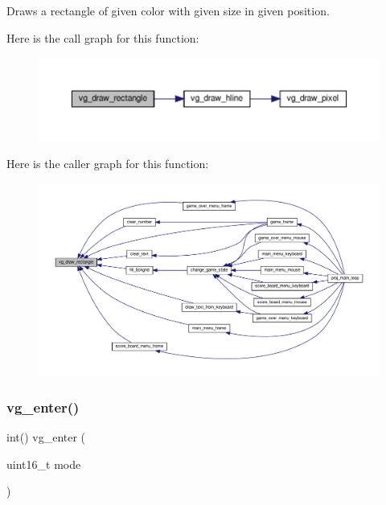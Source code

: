 Draws a rectangle of given color with given size in given position. 

Here is the call graph for this function\+:
\nopagebreak
\begin{figure}[H]
\begin{center}
\leavevmode
\includegraphics[width=350pt]{group__graphics_ga99d2da2559e11200c6b40c469e9977ec_cgraph}
\end{center}
\end{figure}
Here is the caller graph for this function\+:
\nopagebreak
\begin{figure}[H]
\begin{center}
\leavevmode
\includegraphics[width=350pt]{group__graphics_ga99d2da2559e11200c6b40c469e9977ec_icgraph}
\end{center}
\end{figure}
\mbox{\label{group__graphics_gac34ed31db6d6ef68b7167a0c024cac2b}} 
\subsubsection{\texorpdfstring{vg\+\_\+enter()}{vg\_enter()}}
{\footnotesize\ttfamily int() vg\+\_\+enter (\begin{DoxyParamCaption}\item[{uint16\+\_\+t}]{mode }\end{DoxyParamCaption})}



